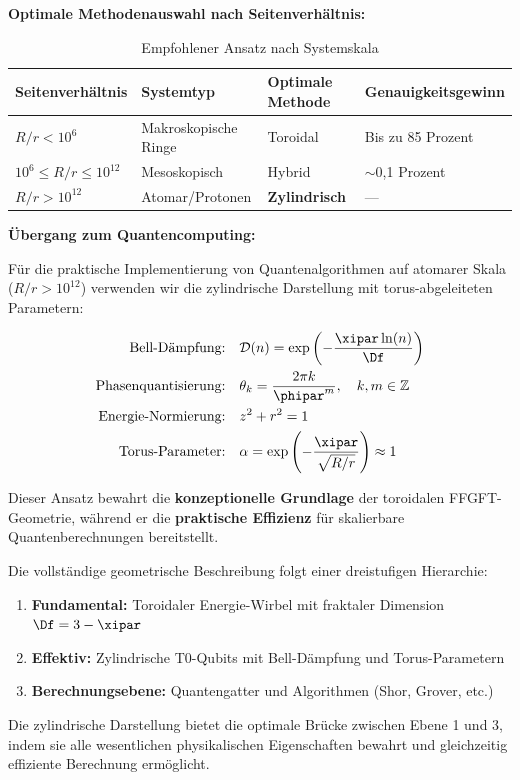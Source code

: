 \textbf{Optimale Methodenauswahl nach Seitenverhältnis:}

\begin{table}[h]
	\centering
	\caption{Empfohlener Ansatz nach Systemskala}
	\label{tab:method_by_scale}
	\begin{tabular}{@{}llll@{}}
		\toprule
		Seitenverhältnis & Systemtyp & Optimale Methode & Genauigkeitsgewinn \\
		\midrule
		$R/r < 10^6$ & Makroskopische Ringe & Toroidal & Bis zu 85 Prozent \\
		$10^6 \leq R/r \leq 10^{12}$ & Mesoskopisch & Hybrid & $\sim$0,1 Prozent \\
		$R/r > 10^{12}$ & Atomar/Protonen & \textbf{Zylindrisch} & --- \\
		\bottomrule
	\end{tabular}
\end{table}

\textbf{Übergang zum Quantencomputing:}

Für die praktische Implementierung von Quantenalgorithmen auf atomarer Skala 
($R/r > 10^{12}$) verwenden wir die zylindrische Darstellung mit 
torus-abgeleiteten Parametern:

\begin{align}
	\text{Bell-Dämpfung:} \quad & \mathcal{D}(n) = \exp\left(-\frac{\xipar\ln(n)}{\Df}\right) \\
	\text{Phasenquantisierung:} \quad & \theta_k = \frac{2\pi k}{\phipar^m}, \quad k,m \in \mathbb{Z} \\
	\text{Energie-Normierung:} \quad & z^2 + r^2 = 1 \\
	\text{Torus-Parameter:} \quad & \alpha = \exp\left(-\frac{\xipar}{\sqrt{R/r}}\right) \approx 1
\end{align}

Dieser Ansatz bewahrt die \textbf{konzeptionelle Grundlage} der toroidalen 
FFGFT-Geometrie, während er die \textbf{praktische Effizienz} für skalierbare 
Quantenberechnungen bereitstellt.

\begin{remark}
	Die vollständige geometrische Beschreibung folgt einer dreistufigen Hierarchie:
	\begin{enumerate}
		\item \textbf{Fundamental:} Toroidaler Energie-Wirbel mit fraktaler Dimension $\Df=3-\xipar$
		\item \textbf{Effektiv:} Zylindrische T0-Qubits mit Bell-Dämpfung und Torus-Parametern
		\item \textbf{Berechnungsebene:} Quantengatter und Algorithmen (Shor, Grover, etc.)
	\end{enumerate}
	Die zylindrische Darstellung bietet die optimale Brücke zwischen Ebene 1 und 3, 
	indem sie alle wesentlichen physikalischen Eigenschaften bewahrt und gleichzeitig 
	effiziente Berechnung ermöglicht.
\end{remark}

